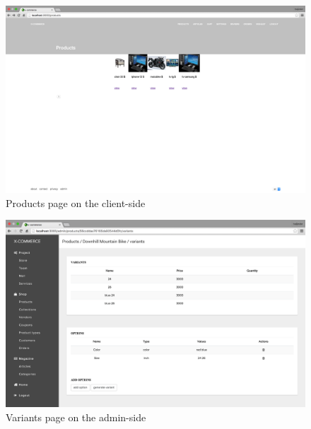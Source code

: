 \begin{figure}[htb]
\centering
\includegraphics[width=1.0\linewidth]{images/chapter4/page-products-all-cli.png}\hfill
\caption[Products page on the client-side]{Products page on the client-side}
\label{fig:page_products_cli}
\end{figure}
\newpage
\begin{figure}[htb]
\centering
\includegraphics[width=1.0\linewidth]{images/chapter4/page-variants.png}\hfill
\caption[Variants page on the admin-side]{Variants page on the admin-side}
\label{fig:page_variants_admin}
\end{figure}
